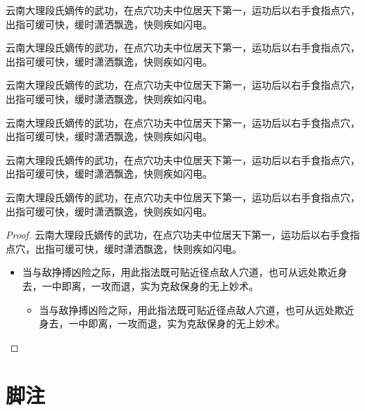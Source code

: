 \documentclass[doctor, vlined, ]{DissertUESTC}
\begin{document}
	\begin{proposition}[具体名称]
		云南大理段氏嫡传的武功，在点穴功夫中位居天下第一，运功后以右手食指点穴，出指可缓可快，缓时潇洒飘逸，快则疾如闪电。
	\end{proposition}
	
	\begin{corollary}[具体名称]
		云南大理段氏嫡传的武功，在点穴功夫中位居天下第一，运功后以右手食指点穴，出指可缓可快，缓时潇洒飘逸，快则疾如闪电。
	\end{corollary}
	
	\begin{lemma}[具体名称]
		云南大理段氏嫡传的武功，在点穴功夫中位居天下第一，运功后以右手食指点穴，出指可缓可快，缓时潇洒飘逸，快则疾如闪电。
	\end{lemma}

	\begin{example}[具体名称]
		云南大理段氏嫡传的武功，在点穴功夫中位居天下第一，运功后以右手食指点穴，出指可缓可快，缓时潇洒飘逸，快则疾如闪电。
	\end{example}

	\begin{assumption}[具体名称]
		云南大理段氏嫡传的武功，在点穴功夫中位居天下第一，运功后以右手食指点穴，出指可缓可快，缓时潇洒飘逸，快则疾如闪电。
	\end{assumption}

	\begin{annotation}[具体名称]
		云南大理段氏嫡传的武功，在点穴功夫中位居天下第一，运功后以右手食指点穴，出指可缓可快，缓时潇洒飘逸，快则疾如闪电。
	\end{annotation}
	
	\begin{proof}
		云南大理段氏嫡传的武功，在点穴功夫中位居天下第一，运功后以右手食指点穴，出指可缓可快，缓时潇洒飘逸，快则疾如闪电。
		\begin{itemize}
			\item 当与敌挣搏凶险之际，用此指法既可贴近径点敌人穴道，也可从远处欺近身去，一中即离，一攻而退，实为克敌保身的无上妙术。
			\begin{itemize}
				\item 当与敌挣搏凶险之际，用此指法既可贴近径点敌人穴道，也可从远处欺近身去，一中即离，一攻而退，实为克敌保身的无上妙术。
			\end{itemize}
		\end{itemize}
	\end{proof}
	
	\newpage

	\section{脚注}
	
\end{document}
